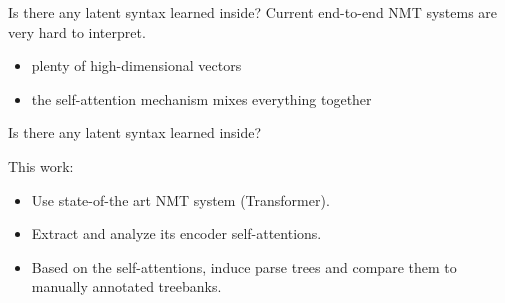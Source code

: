 \documentclass{beamer}
\begin{document}

\begin{frame}{Is there any latent syntax learned inside?}
    Current end-to-end NMT systems are very hard to interpret.
    \begin{itemize}
        \item plenty of high-dimensional vectors
        \item the self-attention mechanism mixes everything together
    \end{itemize}
    
    \bigskip
    Is there any latent syntax learned inside?

    \bigskip
    This work:
    \begin{itemize}
	\item Use state-of-the art NMT system (Transformer).
        \item Extract and analyze its encoder self-attentions.
        \item Based on the self-attentions, induce parse trees and compare them to manually annotated treebanks. 
    \end{itemize}
\end{frame}

%
%

\end{document}
